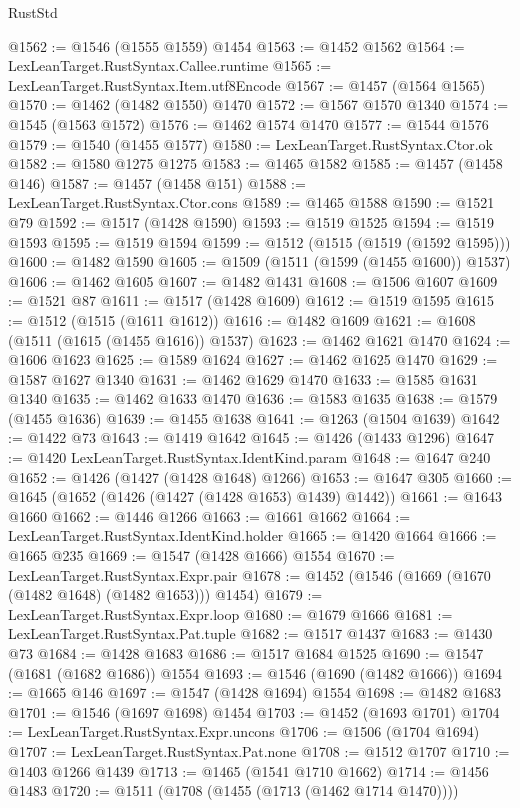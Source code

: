 \begin{lexlean}{RustStd}
\begin{coremodule}
@1562 := @1546 (@1555 @1559) @1454
@1563 := @1452 @1562
@1564 := LexLeanTarget.RustSyntax.Callee.runtime
@1565 := LexLeanTarget.RustSyntax.Item.utf8Encode
@1567 := @1457 (@1564 @1565)
@1570 := @1462 (@1482 @1550) @1470
@1572 := @1567 @1570 @1340
@1574 := @1545 (@1563 @1572)
@1576 := @1462 @1574 @1470
@1577 := @1544 @1576
@1579 := @1540 (@1455 @1577)
@1580 := LexLeanTarget.RustSyntax.Ctor.ok
@1582 := @1580 @1275 @1275
@1583 := @1465 @1582
@1585 := @1457 (@1458 @146)
@1587 := @1457 (@1458 @151)
@1588 := LexLeanTarget.RustSyntax.Ctor.cons
@1589 := @1465 @1588
@1590 := @1521 @79
@1592 := @1517 (@1428 @1590)
@1593 := @1519 @1525
@1594 := @1519 @1593
@1595 := @1519 @1594
@1599 := @1512 (@1515 (@1519 (@1592 @1595)))
@1600 := @1482 @1590
@1605 := @1509 (@1511 (@1599 (@1455 @1600)) @1537)
@1606 := @1462 @1605
@1607 := @1482 @1431
@1608 := @1506 @1607
@1609 := @1521 @87
@1611 := @1517 (@1428 @1609)
@1612 := @1519 @1595
@1615 := @1512 (@1515 (@1611 @1612))
@1616 := @1482 @1609
@1621 := @1608 (@1511 (@1615 (@1455 @1616)) @1537)
@1623 := @1462 @1621 @1470
@1624 := @1606 @1623
@1625 := @1589 @1624
@1627 := @1462 @1625 @1470
@1629 := @1587 @1627 @1340
@1631 := @1462 @1629 @1470
@1633 := @1585 @1631 @1340
@1635 := @1462 @1633 @1470
@1636 := @1583 @1635
@1638 := @1579 (@1455 @1636)
@1639 := @1455 @1638
@1641 := @1263 (@1504 @1639)
@1642 := @1422 @73
@1643 := @1419 @1642
@1645 := @1426 (@1433 @1296)
@1647 := @1420 LexLeanTarget.RustSyntax.IdentKind.param
@1648 := @1647 @240
@1652 := @1426 (@1427 (@1428 @1648) @1266)
@1653 := @1647 @305
@1660 := @1645 (@1652 (@1426 (@1427 (@1428 @1653) @1439) @1442))
@1661 := @1643 @1660
@1662 := @1446 @1266
@1663 := @1661 @1662
@1664 := LexLeanTarget.RustSyntax.IdentKind.holder
@1665 := @1420 @1664
@1666 := @1665 @235
@1669 := @1547 (@1428 @1666) @1554
@1670 := LexLeanTarget.RustSyntax.Expr.pair
@1678 := @1452 (@1546 (@1669 (@1670 (@1482 @1648) (@1482 @1653))) @1454)
@1679 := LexLeanTarget.RustSyntax.Expr.loop
@1680 := @1679 @1666
@1681 := LexLeanTarget.RustSyntax.Pat.tuple
@1682 := @1517 @1437
@1683 := @1430 @73
@1684 := @1428 @1683
@1686 := @1517 @1684 @1525
@1690 := @1547 (@1681 (@1682 @1686)) @1554
@1693 := @1546 (@1690 (@1482 @1666))
@1694 := @1665 @146
@1697 := @1547 (@1428 @1694) @1554
@1698 := @1482 @1683
@1701 := @1546 (@1697 @1698) @1454
@1703 := @1452 (@1693 @1701)
@1704 := LexLeanTarget.RustSyntax.Expr.uncons
@1706 := @1506 (@1704 @1694)
@1707 := LexLeanTarget.RustSyntax.Pat.none
@1708 := @1512 @1707
@1710 := @1403 @1266 @1439
@1713 := @1465 (@1541 @1710 @1662)
@1714 := @1456 @1483
@1720 := @1511 (@1708 (@1455 (@1713 (@1462 @1714 @1470))))

\end{coremodule}
\end{lexlean}

